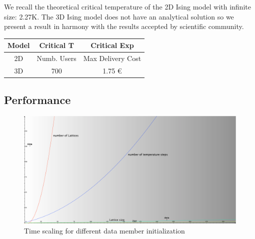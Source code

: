 \documentclass[11pt,a4paper]{article}
\begin{document}
\begin{center}
\end{center}



We recall the theoretical critical temperature of the 2D Ising model with infinite size: 2.27K. The 3D Ising model does not have an analytical solution so we present a result in harmony with the results accepted by scientific community.
\begin{center}
  \begin{tabular}{c|c|c}
 	Model & Critical T & Critical Exp  \\
    \hline    
    \hline
    2D & Numb. Users & Max Delivery Cost \\
    \hline
    \hline
    3D & 700         & 1.75 \euro{}     \\
    \hline
  \end{tabular}
\end{center}


\newpage
\appendix
\subsection*{Performance}
\begin{figure}[h!]
  \centering
   \includegraphics[width=\columnwidth]{img/Andamenti_performance.pdf} 
  \caption{Time scaling for different data member initialization}

\end{figure}
\end{document}
